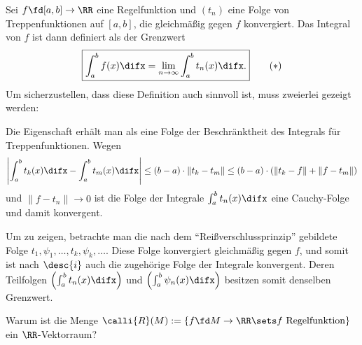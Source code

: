 \begin{antwort}
Sei $f \fd [a,b] \to\RR$ 
eine Regelfunktion und $(t_n)$ eine Folge von Treppenfunktionen 
auf $[a,b]$, die gleichmäßig gegen $f$ konvergiert. Das Integral von $f$ 
ist dann definiert als der Grenzwert 
\begin{equation}
\boxed{
\int_a^b f(x) \difx = \lim_{n\to\infty} \int_a^b t_n (x) \difx.
}
\tag{$\ast$} 
\end{equation}
Um sicherzustellen, dass diese Definition auch sinnvoll ist, muss 
zweierlei gezeigt werden:

\noindent
Die Eigenschaft  erhält man als eine Folge 
der Beschränktheit des Integrals für Treppenfunktionen. 
Wegen
\[
\left| \int_a^b t_k(x) \difx - \int_a^b t_m(x) \difx \right| \le 
(b-a) \cdot \| t_k -t_m \| \le 
(b-a) \cdot ( \|t_k-f\| + \|f-t_m \| )
\]
und $\| f-t_n \| \to 0$ ist die Folge der Integrale 
$\int_a^b t_n(x) \difx$ eine Cauchy-Folge und damit konvergent. 

Um  zu zeigen, betrachte man die nach dem 
"`Reißverschlussprinzip"'  
gebildete Folge $t_1,\psi_1,\ldots,t_k,\psi_k,\ldots$. 
Diese Folge konvergiert gleichmäßig gegen $f$, 
und somit ist nach $\desc{i}$ auch 
die zugehörige Folge der Integrale konvergent. 
Deren Teilfolgen 
$\left( \int_a^b t_n(x)\difx \right)$ und 
$\left( \int_a^b \psi_n(x)\difx \right)$ besitzen somit denselben 
Grenzwert. 
\AntEnd
\end{antwort}

\begin{frage}
Warum ist die Menge
$\calli{R}(M) := \{ f\fd M \to \RR\sets \text{$f$ Regelfunktion} \}$
ein $\RR$-Vektorraum?
\end{frage}


